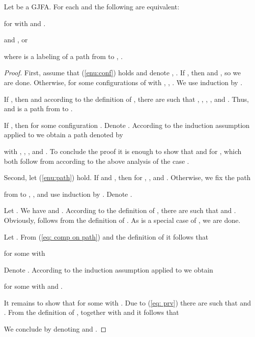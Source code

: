 \documentclass{ws-ijmpc}
\begin{document}
\begin{lemma}
\label{conf vs task}Let  be a GJFA.
For each  and  the following are equivalent:
\begin{romanlist}
\item \label{enu:conf}
for  with 
and .
\item \label{enu:path} and , or 

where  is a labeling of a path from 
to , .
\end{romanlist}
\end{lemma}
\begin{proof}
First, assume that (\ref{enu:conf}) holds and denote ,
. If , then
 and , so we are done. Otherwise, 
for some configurations  of
 with , ,
. We use induction by . 

If , then  and
according to the definition of , there are
 such that ,
, , , and .
Thus,  and  is a path
from  to .

If , then 
for some configuration . Denote .
According to the induction assumption applied to  we
obtain a path denoted by 

with , , , and .
To conclude the proof it is enough to show that 
and  for , which both follow from
 according to the above
analysis of the case . 

Second, let (\ref{enu:path}) hold. If  and , then 
for , , and . Otherwise,
we fix the path 

from  to , , and use induction by .
Denote . 

Let . We have  and .
According to the definition of , there are 
such that  and . Obviously, 
follows from the definition of . As 
is a special case of , we are done. 

Let . From (\ref{eq: comp on path}) and the definition of
 it follows that 

for some  with 

Denote . According to the induction assumption applied to
 we obtain 

for some  with 
and .

It remains to show that 
for some  with . Due to (\ref{eq: prv})
there are  such that  and
. From the definition of , together
with  and 
it follows that 

We conclude by denoting  and .
\end{proof}
\end{document}
